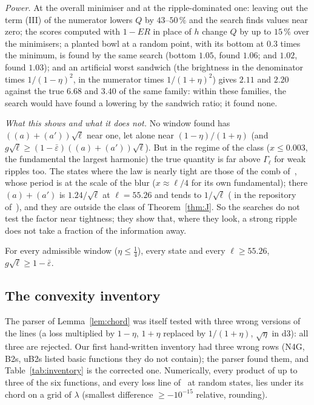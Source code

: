 \emph{Power.}
At the overall minimiser and at the ripple-dominated one: leaving out the term (III) of the numerator lowers $Q$ by $43$--$50\,\%$ and the search finds values near zero; the scores computed with $1-ER$ in place of $h$ change $Q$ by up to $15\,\%$ over the minimisers; a planted bowl at a random point, with its bottom at $0.3$ times the minimum, is found by the same search (bottom $1.05$, found $1.06$; and $1.02$, found $1.03$); and an artificial worst sandwich (the brightness in the denominator times $1/(1-\eta)^2$, in the numerator times $1/(1+\eta)^2$) gives $2.11$ and $2.20$ against the true $6.68$ and $3.40$ of the same family: within these families, the search would have found a lowering by the sandwich ratio; it found none.

\emph{What this shows and what it does not.}
No window found has $((a)+(a'))\sqrt\ell$ near one, let alone near $(1-\eta)/(1+\eta)$ (and $g\sqrt\ell\ge(1-\bar\varepsilon)((a)+(a'))\sqrt\ell$).
But in the regime of the class ($x\le0.003$, the fundamental the largest harmonic) the true quantity is far above $\Gamma_\ell$ for weak ripples too.
The states where the law is nearly tight are those of the comb of~\cite{F}, whose period is at the scale of the blur ($x\approx\ell/4$ for its own fundamental); there $(a)+(a')$ is $1.24/\sqrt\ell$ at $\ell=55.26$ and tends to $1/\sqrt\ell$ ( in the repository of~\cite{I}), and they are outside the class of Theorem~\ref{thm:J}.
So the searches do not test the factor near tightness; they show that, where they look, a strong ripple does not take a fraction of the information away.
\begin{conjecture} \conjst
\label{conj:one}
For every admissible window ($\eta\le\tfrac14$), every state and every $\ell\ge55.26$, $g\sqrt\ell\ge1-\bar\varepsilon$.
\end{conjecture}

\subsection{The convexity inventory}
The parser of Lemma~\ref{lem:chord} was itself tested with three wrong versions of the lines (a loss multiplied by $1-\eta$, $1+\eta$ replaced by $1/(1+\eta)$, $\sqrt\eta$ in d3): all three are rejected.
Our first hand-written inventory had three wrong rows (N4G, B2s, uB2s listed basic functions they do not contain); the parser found them, and Table~\ref{tab:inventory} is the corrected one.
Numerically, every product of up to three of the six functions, and every loss line of~\cite{I} at random states, lies under its chord on a grid of $\lambda$ (smallest difference $\ge-10^{-15}$ relative, rounding).
